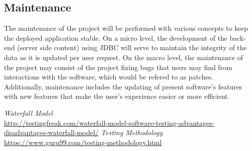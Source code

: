 \documentclass[12pt]{article}
\begin{document}
\begin{myspace}{1.7}
\section*{Maintenance}  
	The maintenance of the project will be performed with various concepts to keep the deployed application stable. On a micro level, the development of the back-end (server side content) using JDBC will serve to maintain the integrity of the data as it is updated per user request. On the macro level, the maintenance of the project may consist of the project fixing bugs that users may find from interactions with the software, which would be refered to as patches. Additionally, maintenance includes the updating of present software's features with new features that make the user's experience easier or more efficient.




%
%
\pagebreak
\begin{thebibliography}{9}
   \textit{Waterfall Model}\\
   \url{http://testingfreak.com/waterfall-model-software-testing-advantages-disadvantages-waterfall-model/}
   \textit{Testing Methodology}\\
   \url{https://www.guru99.com/testing-methodology.html}
\end{thebibliography}
  
\end{myspace}
\end{document}
